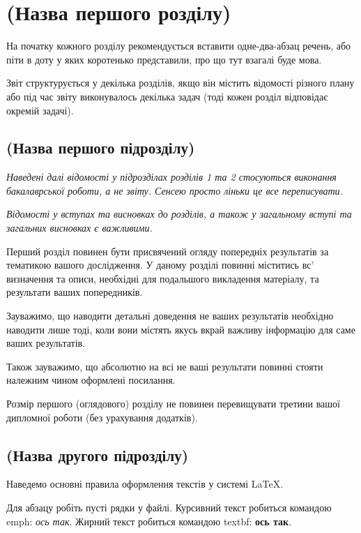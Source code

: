 \chapter{(Назва першого розділу)}
\label{chap:review}  %

На початку кожного розділу рекомендується вставити одне-два-абзац речень, або піти в доту 
у яких коротенько представили, про що тут взагалі буде мова.

Звіт структурується у декілька розділів, якщо він містить відомості 
різного плану або під час звіту виконувалось декілька задач (тоді кожен 
розділ відповідає окремій задачі).

\section{(Назва першого підрозділу)}

\emph{Наведені далі відомості у підрозділах розділів 1 та 2 стосуються 
виконання бакалаврської роботи, а не звіту. Сенсею просто ліньки це все 
переписувати.}

\emph{Відомості у вступах та висновках до розділів, а також у загальному вступі 
та загальних висновках є важливими.}

Перший розділ повинен бути присвячений огляду попередніх результатів за 
тематикою вашого дослідження. У даному розділі повинні міститись вс' 
визначення та описи, необхідні для подальшого викладення матеріалу, та результати 
ваших попередників.

Зауважимо, що наводити детальні доведення не ваших результатів необхідно 
наводити лише тоді, коли вони містять якусь вкрай важливу інформацію для 
саме ваших результатів.

Також зауважимо, що абсолютно на всі не ваші результати повинні стояти 
належним чином оформлені посилання.

Розмір першого (оглядового) розділу не повинен перевищувати третини вашої 
дипломної роботи (без урахування додатків).


\section{(Назва другого підрозділу)}

Наведемо основні правила оформлення текстів у системі \LaTeX.

Для абзацу робіть пусті рядки у файлі. Курсивний текст робиться командою 
emph: \emph{ось так}. Жирний текст робиться командою textbf: \textbf{ось так}.

